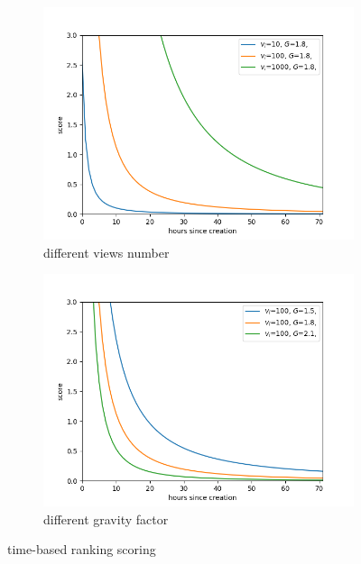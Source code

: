 \documentclass{article}
\begin{document}
    \begin{figure}[h]
      \begin{subfigure}[b]{0.5\textwidth}
        \includegraphics[width=\textwidth]{images/time_ranking_1.png}
        \caption{different views number}
      \end{subfigure}
      \hfill
      \begin{subfigure}[b]{0.5\textwidth}
        \includegraphics[width=\textwidth]{images/time_ranking_2.png}
        \caption{different gravity factor}
      \end{subfigure}
    \caption{time-based ranking scoring}
        \label{fig:samples}
    \end{figure}
\end{document}
